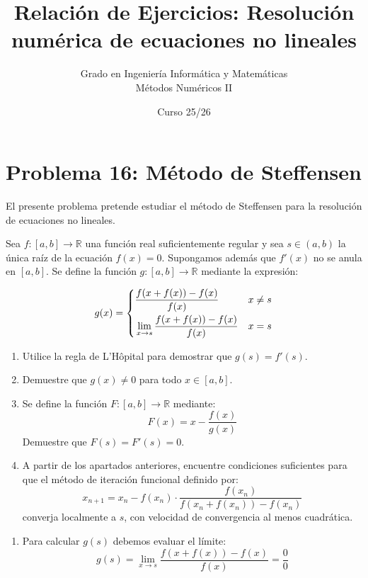 \documentclass[11pt]{article}
\title{Relación de Ejercicios: Resolución numérica de ecuaciones no lineales}
\author{Grado en Ingeniería Informática y Matemáticas \\ Métodos Numéricos II}
\date{Curso 25/26}
\begin{document}
\maketitle

\section*{Problema 16: Método de Steffensen} 

El presente problema pretende estudiar el método de Steffensen para la resolución de ecuaciones no lineales. %

Sea $f:[a,b] \longrightarrow \mathbb{R}$ una función real suficientemente regular y sea $s \in (a,b)$ la única raíz de la ecuación $f(x)=0$. Supongamos además que $f'(x)$ no se anula en $[a,b]$. %
Se define la función $g:[a,b] \longrightarrow \mathbb{R}$ mediante la expresión: 

\[
g(x) = \begin{cases} 
      \dfrac{f(x+f(x))-f(x)}{f(x)} & x \neq s \\ 
      \rule{0pt}{4ex} \displaystyle \lim_{x \to s} \frac{f(x+f(x))-f(x)}{f(x)} & x = s 
   \end{cases}
\] 

\begin{enumerate}
    \item[a)] Utilice la regla de L'Hôpital para demostrar que $g(s)=f'(s)$. 
    
    \item[b)] Demuestre que $g(x) \neq 0$ para todo $x \in [a,b]$. 
    
    \item[c)] Se define la función $F:[a,b] \longrightarrow \mathbb{R}$ mediante: 
    \[
    F(x) = x - \frac{f(x)}{g(x)}
    \] 
    Demuestre que $F(s) = F'(s) = 0$. 
    
    \item[d)] A partir de los apartados anteriores, encuentre condiciones suficientes para que el método de iteración funcional definido por: %
    \[
    x_{n+1} = x_{n} - f(x_{n}) \cdot \frac{f(x_{n})}{f(x_{n}+f(x_{n})) - f(x_{n})}
    \] 
    converja localmente a $s$, con velocidad de convergencia al menos cuadrática. 
\end{enumerate}

\begin{enumerate}
    \item [a)]
    Para calcular $g(s)$ debemos evaluar el límite:
\[
g(s) = \lim_{x \to s} \frac{f(x+f(x))-f(x)}{f(x)} = \frac{0}{0}
\]
    
\end{enumerate}
\end{document}
